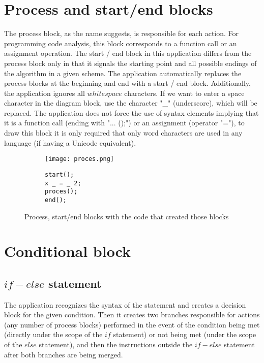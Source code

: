 \section{Process and start/end blocks}
The process block, as the name suggests, is responsible for each action. For programming code analysis, this block corresponds to a function call or an assignment operation. The start / end block in this application differs from the process block only in that it signals the starting point and all possible endings of the algorithm in a given scheme. The application automatically replaces the process blocks at the beginning and end with a start / end block. Additionally, the application ignores all $whitespace$ characters. If we want to enter a space character in the diagram block, use the character "\_" (underscore), which will be replaced. The application does not force the use of syntax elements implying that it is a function call (ending with "... ();") or an assignment (operator "="), to draw this block it is only required that only word characters  are used in any language (if having a Unicode equivalent). 
	
	\begin{figure}[H]
  \begin{subfigure}[t]{0.49\textwidth}
    \vspace{0pt}
    \centering
    \texttt{[image: proces.png]}
  \end{subfigure}\hfill
  \begin{subfigure}[t]{0.49\textwidth}
    \begin{verbatim}
start();
x _ = _ 2;
proces();
end();
    \end{verbatim}
  \end{subfigure}%
  \caption{Process, start/end blocks with the code that created those blocks }
\end{figure}

\section{Conditional block }
  \subsection{$if-else$ statement }	 
	
	  The application recognizes the syntax of the statement and creates a decision block for the given condition. Then it creates two branches responsible for actions (any number of process blocks) performed in the event of the condition being met (directly under the scope of the $if$ statement) or not being met (under the scope of the $else$ statement), and then the instructions outside the $if-else$ statement after both branches are being merged.   
		

